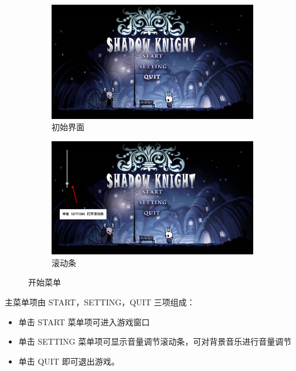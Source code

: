 \documentclass[12pt, twoside, a4paper]{article}
\begin{document}
\begin{figure}[h!]
    \centering
    \begin{subfigure}{0.4\textwidth}
        \includegraphics[width=\textwidth]{assets/report/menu.png}
        \caption{初始界面}
        \label{fig: menu}
    \end{subfigure}
    \hspace{0.05\textwidth}
    \begin{subfigure}{0.4\textwidth}
        \includegraphics[width=\textwidth]{assets/report/scrollbar.png}
        \caption{滚动条}
    \end{subfigure}
    \caption{开始菜单}
\end{figure}

主菜单项由 START，SETTING，QUIT 三项组成：
\begin{itemize}
    \item 单击 START 菜单项可进入游戏窗口
    \item 单击 SETTING 菜单项可显示音量调节滚动条，可对背景音乐进行音量调节
    \item 单击 QUIT 即可退出游戏。
\end{itemize}
\end{document}
